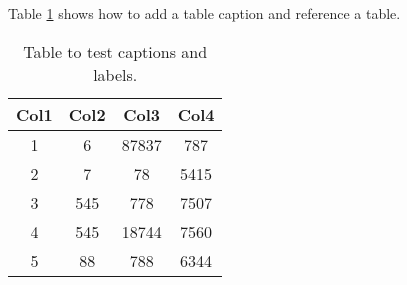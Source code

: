 \documentclass{article}
\begin{document}
    
Table \ref{table:data} shows how to add a table caption and reference a table.

\begin{table}[h!]
\centering
\begin{tabular}{||c c c c||}
    \hline
    Col1 & Col2 & Col3 & Col4 \\ [0.5ex]
    \hline\hline
    1 & 6 & 87837 & 787 \\
    2 & 7 & 78 & 5415 \\
    3 & 545 & 778 & 7507 \\
    4 & 545 & 18744 & 7560 \\
    5 & 88 & 788 & 6344 \\ [1ex]
    \hline
\end{tabular}
\caption{Table to test captions and labels.}
\label{table:data}
\end{table}
\end{document}
